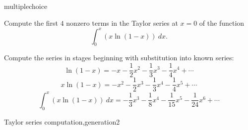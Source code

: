 \documentclass{ximera}
\begin{document}
\begin{question}[TaylorExpand011]
\begin{type}
multiplechoice
\end{type}
Compute the first \(4\) nonzero terms in the Taylor series 
at \(x=0\) of the function \[\int_0^x \left( x \ln (1-x) \right) ~ dx.\]
\begin{multiplechoice}
\end{multiplechoice}
\begin{feedback}
Compute the series in stages beginning with substitution into known series:
\[\ln (1-x) =  - x - \frac{1}{2}x^{2} - \frac{1}{3}x^{3} - \frac{1}{4}x^{4} + \cdots \]
\[x \ln (1-x) =  - x^{2} - \frac{1}{2}x^{3} - \frac{1}{3}x^{4} - \frac{1}{4}x^{5} + \cdots \]
\[\int_0^x \left( x \ln (1-x) \right) ~ dx =  - \frac{1}{3}x^{3} - \frac{1}{8}x^{4} - \frac{1}{15}x^{5} - \frac{1}{24}x^{6} + \cdots \]
\end{feedback}
\begin{keywords}
Taylor series computation,generation2
\end{keywords}
\end{question}
\end{document}
